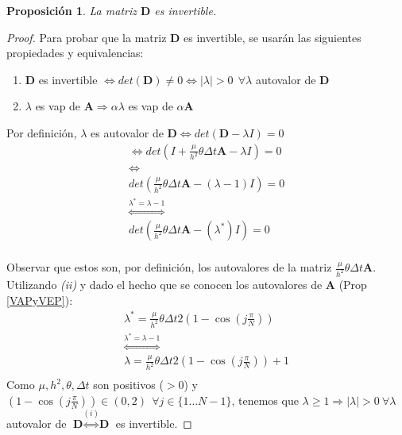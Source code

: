 \documentclass{endm}
\newtheorem{prop_es}{Proposición}
\begin{document}
\begin{prop_es}\label{dinver}
    La matriz $\textbf{D}$ es invertible.
\end{prop_es}
\begin{proof}
Para probar que la matriz $\textbf{D}$ es invertible, se usar\'an las siguientes propiedades y equivalencias: 
\begin{enumerate}
    \item $\textbf{D}$ es invertible $\Leftrightarrow det(\textbf{D}) \neq 0 \Leftrightarrow \lvert \lambda \rvert > 0 \ \ \forall \lambda$ autovalor de  $\textbf{D}$%
    \item $\lambda$ es vap de $\textbf{A} \Rightarrow \alpha\lambda$ es vap de $\alpha\textbf{A}$
\end{enumerate}

Por definici\'on, $\lambda$ es autovalor de $\textbf{D} \Leftrightarrow det(\textbf{D} - \lambda I) = 0$
\begin{gather*}
\Leftrightarrow det(I + \frac{\mu}{h^2}\theta \Delta t \textbf{A} - \lambda I) = 0 \\
\Leftrightarrow \\
det(\frac{\mu}{h^2}\theta \Delta t \textbf{A} - (\lambda - 1)I) = 0\\
\overset{\lambda^{*} = \lambda - 1}{\iff}\\
det(\frac{\mu}{h^2}\theta \Delta t \textbf{A} - (\lambda^{*})I) = 0\\
\end{gather*}

Observar que estos son, por definici\'on, los autovalores de la matriz $\frac{\mu}{h^2}\theta\Delta t \textbf{A}$. Utilizando \textit{(ii)} y dado el hecho que se conocen los autovalores de $\textbf{A}$ (Prop \ref{VAPyVEP}): 
\begin{gather*}
\lambda^{*} = \frac{\mu}{h^2}\theta\Delta t 2(1-\cos(j \frac{\pi}{N}))\\
\overset{\lambda^{*} = \lambda - 1}{\iff}\\
\lambda = \frac{\mu}{h^2}\theta\Delta t 2(1-\cos(j \frac{\pi}{N}))+1 \\
\end{gather*}
Como $\mu, h^2, \theta, \Delta t$ son positivos ($>0$) y $(1-\cos(j\frac{\pi}{N})) \in (0, 2) \ \ \forall j \in \{1 \dots N-1\}$, tenemos que $\lambda \ge 1 \Rightarrow |\lambda | > 0 \ \forall \lambda$ autovalor de  $\textbf{D} \overset{(i)}{\Leftrightarrow} \textbf{D}$ es invertible.
\end{proof}
\end{document}

